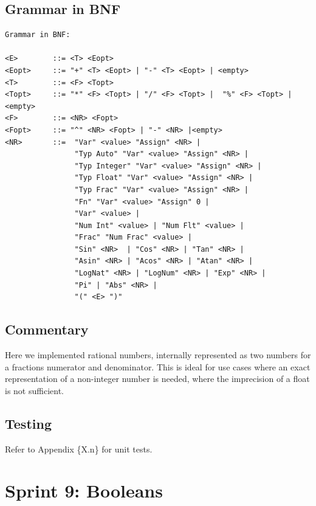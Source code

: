 \documentclass[a4paper, oneside, 11pt]{report}
\begin{document}
    \subsection{Grammar in BNF}
    \begin{verbatim}
Grammar in BNF:

<E>        ::= <T> <Eopt>
<Eopt>     ::= "+" <T> <Eopt> | "-" <T> <Eopt> | <empty>
<T>        ::= <F> <Topt>
<Topt>     ::= "*" <F> <Topt> | "/" <F> <Topt> |  "%" <F> <Topt> |<empty>
<F>        ::= <NR> <Fopt>
<Fopt>     ::= "^" <NR> <Fopt> | "-" <NR> |<empty>
<NR>       ::=  "Var" <value> "Assign" <NR> |
                "Typ Auto" "Var" <value> "Assign" <NR> |
                "Typ Integer" "Var" <value> "Assign" <NR> |
                "Typ Float" "Var" <value> "Assign" <NR> |
                "Typ Frac" "Var" <value> "Assign" <NR> |
                "Fn" "Var" <value> "Assign" 0 |
                "Var" <value> |
                "Num Int" <value> | "Num Flt" <value> |
                "Frac" "Num Frac" <value> |
                "Sin" <NR>  | "Cos" <NR> | "Tan" <NR> |
                "Asin" <NR> | "Acos" <NR> | "Atan" <NR> |
                "LogNat" <NR> | "LogNum" <NR> | "Exp" <NR> |
                "Pi" | "Abs" <NR> |
                "(" <E> ")"
    \end{verbatim}
    \subsection{Commentary}
    Here we implemented rational numbers, internally represented as two numbers for a fractions numerator and denominator. This is ideal for use cases where an exact representation of a non-integer number is needed, where the imprecision of a float is not sufficient.

    \subsection{Testing}
    Refer to Appendix \{X.n\} for unit tests.

    \clearpage
    \section{Sprint 9: Booleans }
\end{document}
